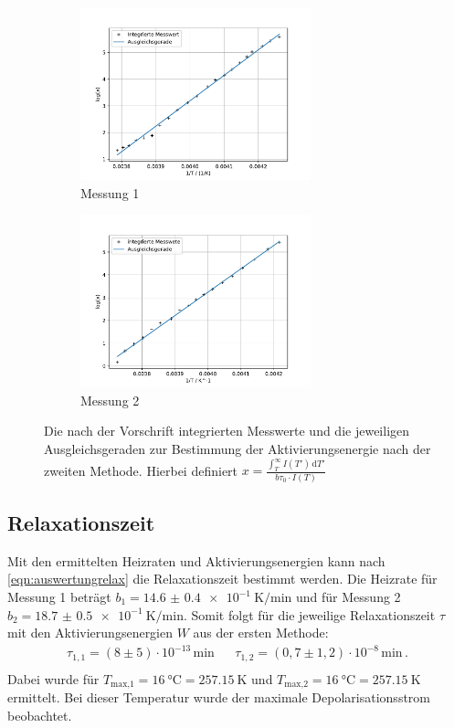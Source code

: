   \begin{figure}[H]
    \begin{subfigure}[b]{.5\linewidth}
      \centering
      \includegraphics[height=5cm, keepaspectratio]{build/log(int)_2durchT_1.pdf}
      \caption{Messung 1}
    \end{subfigure}
    \begin{subfigure}[b]{.5\linewidth}
      \centering
      \includegraphics[height=5cm, keepaspectratio]{build/log(int)_2durchT_2.pdf}
      \caption{Messung 2}
    \end{subfigure}
    \caption{Die nach der Vorschrift integrierten Messwerte und die jeweiligen Ausgleichsgeraden zur Bestimmung der Aktivierungsenergie nach der zweiten Methode.
      Hierbei definiert $x = \frac{\int_T^\infty I(T') \, \text{d}T'}{b \tau_0 \cdot I(T)}$}
    \label{fig:Trapez}
  \end{figure} %

\subsection{Relaxationszeit}
  Mit den ermittelten Heizraten und Aktivierungsenergien kann nach \eqref{eqn:auswertungrelax} die Relaxationszeit bestimmt werden.
  Die Heizrate für Messung 1 beträgt $b_1 = \SI{14.6(04)e-1}{\kelvin\per\minute}$ und für Messung 2 $b_2 = \SI{18.7(05)e-1}{\kelvin\per\minute}$.
  Somit folgt für die jeweilige Relaxationszeit $\tau$ mit den Aktivierungsenergien $W$ aus der ersten Methode:
  \begin{align*}
    \tau_{1,1} = (8\pm 5)\cdot 10^{-13}\,\si{\minute} &&  \tau_{1,2} = (0,7\pm 1,2)\cdot 10^{-8}\,\si{\minute} \, . \\ %
  \end{align*}
  Dabei wurde für $T_\text{max,1} = \SI{16}{\celsius} = \SI{257.15}{\kelvin} $ und $T_\text{max,2} = \SI{16}{\celsius} = \SI{257.15}{\kelvin}$ ermittelt. %
  Bei dieser Temperatur wurde der maximale Depolarisationsstrom beobachtet.

